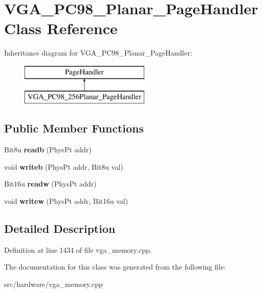 \hypertarget{classVGA__PC98__256Planar__PageHandler}{\section{V\-G\-A\-\_\-\-P\-C98\-\_\-Planar\-\_\-\-Page\-Handler Class Reference}
\label{classVGA__PC98__256Planar__PageHandler}
}
Inheritance diagram for V\-G\-A\-\_\-\-P\-C98\-\_\-Planar\-\_\-\-Page\-Handler\-:\begin{figure}[H]
\begin{center}
\leavevmode
\includegraphics[height=2.000000cm]{classVGA__PC98__256Planar__PageHandler}
\end{center}
\end{figure}
\subsection*{Public Member Functions}
\begin{DoxyCompactItemize}
\item 
\hypertarget{classVGA__PC98__256Planar__PageHandler_a29dc2143b0322e3e1f4f35db0c1d74b9}{Bit8u {\bfseries readb} (Phys\-Pt addr)}\label{classVGA__PC98__256Planar__PageHandler_a29dc2143b0322e3e1f4f35db0c1d74b9}

\item 
\hypertarget{classVGA__PC98__256Planar__PageHandler_aa105562f74f5ce9b5eaa9f63bdde58cf}{void {\bfseries writeb} (Phys\-Pt addr, Bit8u val)}\label{classVGA__PC98__256Planar__PageHandler_aa105562f74f5ce9b5eaa9f63bdde58cf}

\item 
\hypertarget{classVGA__PC98__256Planar__PageHandler_ab0ea5a0e50cf5475b255be9817509adf}{Bit16u {\bfseries readw} (Phys\-Pt addr)}\label{classVGA__PC98__256Planar__PageHandler_ab0ea5a0e50cf5475b255be9817509adf}

\item 
\hypertarget{classVGA__PC98__256Planar__PageHandler_a2e95c91ae5e4a008bd9a0ba5a1b536ec}{void {\bfseries writew} (Phys\-Pt addr, Bit16u val)}\label{classVGA__PC98__256Planar__PageHandler_a2e95c91ae5e4a008bd9a0ba5a1b536ec}

\end{DoxyCompactItemize}


\subsection{Detailed Description}


Definition at line 1434 of file vga\-\_\-memory.\-cpp.



The documentation for this class was generated from the following file\-:\begin{DoxyCompactItemize}
\item 
src/hardware/vga\-\_\-memory.\-cpp\end{DoxyCompactItemize}
